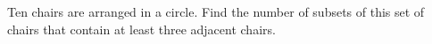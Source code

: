 Ten chairs are arranged in a circle. Find the number of subsets of this set of chairs that contain at least three adjacent chairs.